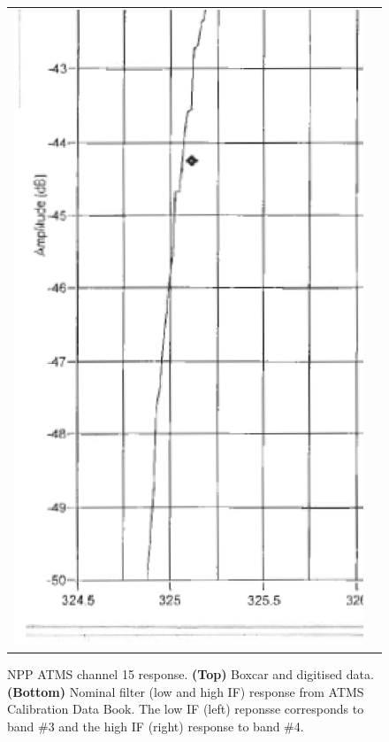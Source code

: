 \begin{figure}[H]
\begin{tabular}{c c}
    \includegraphics[bb=249 194 1431 1035,scale=0.2]{graphics/log_book/ch15_hif.eps}
  \end{tabular}
  \caption{NPP ATMS channel 15 response. \textbf{(Top)} Boxcar and digitised data. \textbf{(Bottom)} Nominal filter (low and high IF) response from ATMS Calibration Data Book\cite{ATMS_PFM_CalLog}. The low IF (left) reponsse corresponds to band \#3 and the high IF (right) response to band \#4.}
  \label{fig:atms_npp.ch15.srf}
\end{figure}

